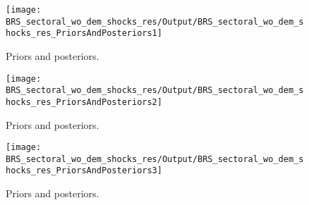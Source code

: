  
\begin{figure}[H]
\centering
\texttt{[image: BRS\_sectoral\_wo\_dem\_shocks\_res/Output/BRS\_sectoral\_wo\_dem\_shocks\_res\_PriorsAndPosteriors1]}
\caption{Priors and posteriors.}\label{Fig:PriorsAndPosteriors:1}
\end{figure}
 
\begin{figure}[H]
\centering
\texttt{[image: BRS\_sectoral\_wo\_dem\_shocks\_res/Output/BRS\_sectoral\_wo\_dem\_shocks\_res\_PriorsAndPosteriors2]}
\caption{Priors and posteriors.}\label{Fig:PriorsAndPosteriors:2}
\end{figure}
 
\begin{figure}[H]
\centering
\texttt{[image: BRS\_sectoral\_wo\_dem\_shocks\_res/Output/BRS\_sectoral\_wo\_dem\_shocks\_res\_PriorsAndPosteriors3]}
\caption{Priors and posteriors.}\label{Fig:PriorsAndPosteriors:3}
\end{figure}
 
